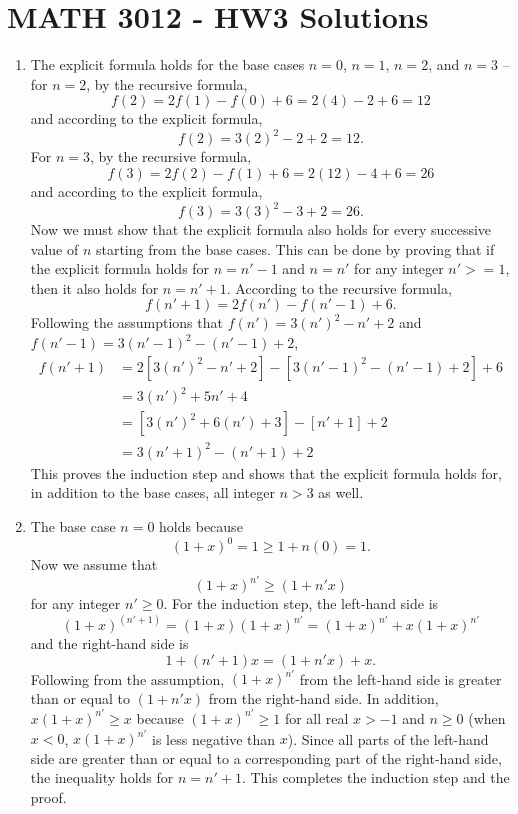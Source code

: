 \documentclass[a4paper,12pt]{article}
\begin{document}
\section*{MATH 3012 - HW3 Solutions}

\begin{enumerate}

\item The explicit formula holds for the base cases $n = 0$, $n = 1$, $n = 2$, and $n = 3$ -- for $n = 2$, by the recursive formula,
\[ f(2) = 2f(1)-f(0)+6 = 2(4)-2+6 = 12 \]
and according to the explicit formula,
\[ f(2) = 3(2)^2 - 2 + 2 = 12.\]
For $n = 3$, by the recursive formula,
\[ f(3) = 2f(2)-f(1)+6 = 2(12)-4+6 = 26 \]
and according to the explicit formula,
\[ f(3) = 3(3)^2 - 3 + 2 = 26.\]
Now we must show that the explicit formula also holds for every successive value of $n$ starting from the base cases. This can be done by proving that if the explicit formula holds for $n = n' - 1$ and $n = n'$ for any integer $n' > = 1$, then it also holds for $n = n' + 1$. According to the recursive formula,
\[ f(n' + 1) = 2f(n') - f(n' - 1) + 6.\]
Following the assumptions that $f(n') = 3(n')^2 - n' + 2$ and $f(n' - 1) = 3 (n' - 1)^2 - (n' - 1) + 2$,
\begin{equation*}
\begin{split}
f(n' + 1) &= 2[3(n')^2 - n' + 2] - [3 (n' - 1)^2 - (n' - 1) + 2] + 6 \\
&= 3(n')^2 + 5n' + 4 \\
&= [3(n')^2 + 6(n') + 3] - [n' + 1] + 2 \\
&= 3(n' + 1)^2 - (n' + 1) + 2
\end{split}
\end{equation*}
This proves the induction step and shows that the explicit formula holds for, in addition to the base cases, all integer $n > 3$ as well.

\item The base case $n = 0$ holds because
\[ (1 + x)^0 = 1 \geq 1 + n(0) = 1.\]
Now we assume that
\[ (1 + x)^{n'} \geq (1 + n'x) \]
for any integer $n' \geq 0$. For the induction step, the left-hand side is
\[ (1 + x)^{(n' + 1)} = (1 + x)(1 + x)^{n'} = (1 + x)^{n'} + x(1 + x)^{n'} \]
and the right-hand side is
\[ 1 + (n' + 1)x = (1 + n'x) + x. \]
Following from the assumption, $(1 + x)^{n'}$ from the left-hand side is greater than or equal to $(1 + n'x)$ from the right-hand side. In addition, $x(1 + x)^{n'} \geq x$ because $(1 + x)^{n'} \geq 1$ for all real $x > -1$ and $n \geq 0$ (when $x < 0$, $x(1 + x)^{n'}$ is less negative than $x$). Since all parts of the left-hand side are greater than or equal to a corresponding part of the right-hand side, the inequality holds for $n = n' + 1$. This completes the induction step and the proof.


\end{enumerate}
\end{document}
